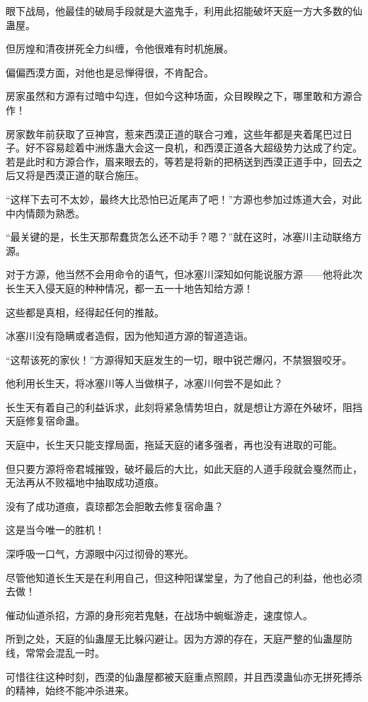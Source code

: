 \begin{this_body}
眼下战局，他最佳的破局手段就是大盗鬼手，利用此招能破坏天庭一方大多数的仙蛊屋。

但厉煌和清夜拼死全力纠缠，令他很难有时机施展。

偏偏西漠方面，对他也是忌惮得很，不肯配合。

房家虽然和方源有过暗中勾连，但如今这种场面，众目睽睽之下，哪里敢和方源合作！

房家数年前获取了豆神宫，惹来西漠正道的联合刁难，这些年都是夹着尾巴过日子。好不容易趁着中洲炼蛊大会这一良机，和西漠正道各大超级势力达成了约定。若是此时和方源合作，眉来眼去的，等若是将新的把柄送到西漠正道手中，回去之后又将是西漠正道的联合施压。

“这样下去可不太妙，最终大比恐怕已近尾声了吧！”方源也参加过炼道大会，对此中内情颇为熟悉。

“最关键的是，长生天那帮蠢货怎么还不动手？嗯？”就在这时，冰塞川主动联络方源。

对于方源，他当然不会用命令的语气，但冰塞川深知如何能说服方源——他将此次长生天入侵天庭的种种情况，都一五一十地告知给方源！

这些都是真相，经得起任何的推敲。

冰塞川没有隐瞒或者造假，因为他知道方源的智道造诣。

“这帮该死的家伙！”方源得知天庭发生的一切，眼中锐芒爆闪，不禁狠狠咬牙。

他利用长生天，将冰塞川等人当做棋子，冰塞川何尝不是如此？

长生天有着自己的利益诉求，此刻将紧急情势坦白，就是想让方源在外破坏，阻挡天庭修复宿命蛊。

天庭中，长生天只能支撑局面，拖延天庭的诸多强者，再也没有进取的可能。

但只要方源将帝君城摧毁，破坏最后的大比，如此天庭的人道手段就会戛然而止，无法再从不败福地中抽取成功道痕。

没有了成功道痕，袁琼都怎会胆敢去修复宿命蛊？

这是当今唯一的胜机！

深呼吸一口气，方源眼中闪过彻骨的寒光。

尽管他知道长生天是在利用自己，但这种阳谋堂皇，为了他自己的利益，他也必须去做！

催动仙道杀招，方源的身形宛若鬼魅，在战场中蜿蜒游走，速度惊人。

所到之处，天庭的仙蛊屋无比躲闪避让。因为方源的存在，天庭严整的仙蛊屋防线，常常会混乱一时。

可惜往往这种时刻，西漠的仙蛊屋都被天庭重点照顾，并且西漠蛊仙亦无拼死搏杀的精神，始终不能冲杀进来。


\end{this_body}
